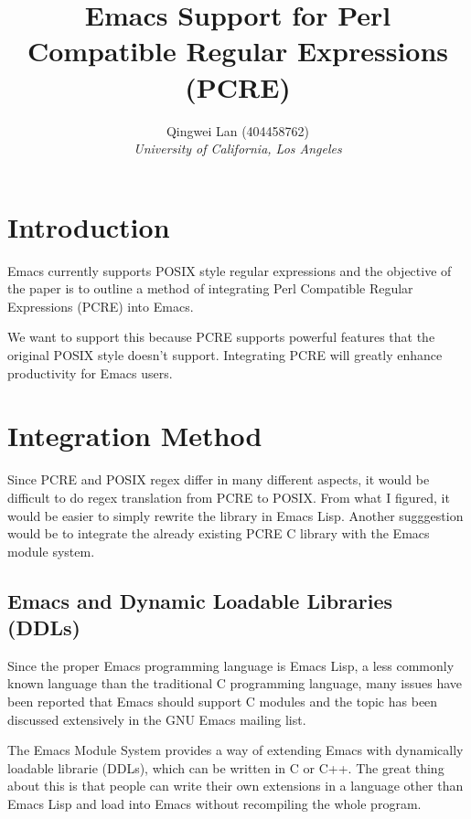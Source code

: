 \documentclass[12pt]{article}
\begin{document}
\title{Emacs Support for Perl Compatible Regular Expressions (PCRE)}
\author{Qingwei Lan (404458762)\\ \textit{University of California, Los Angeles}}
\maketitle



\section{Introduction}

Emacs currently supports POSIX style regular expressions and the objective of the paper is to outline a method of integrating Perl Compatible Regular Expressions (PCRE) into Emacs.

We want to support this because PCRE supports powerful features that the original POSIX style doesn't support. Integrating PCRE will greatly enhance productivity for Emacs users.



\section{Integration Method}

Since PCRE and POSIX regex differ in many different aspects, it would be difficult to do regex translation from PCRE to POSIX. From what I figured, it would be easier to simply rewrite the library in Emacs Lisp. Another sugggestion would be to integrate the already existing PCRE C library with the Emacs module system.



\subsection{Emacs and Dynamic Loadable Libraries (DDLs)}

Since the proper Emacs programming language is Emacs Lisp, a less commonly known language than the traditional C programming language, many issues have been reported that Emacs should support C modules and the topic has been discussed extensively in the GNU Emacs mailing list.

The Emacs Module System provides a way of extending Emacs with dynamically loadable librarie (DDLs), which can be written in C or C++. The great thing about this is that people can write their own extensions in a language other than Emacs Lisp and load into Emacs without recompiling the whole program.
\end{document}
